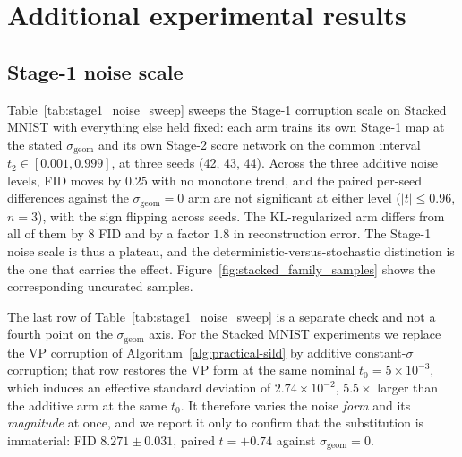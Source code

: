 
\section{Additional experimental results}
\label{app:extra-experiments}

\subsection{Stage-1 noise scale}
\label{app:stage1-noise}

Table~\ref{tab:stage1_noise_sweep} sweeps the Stage-1 corruption scale on
Stacked MNIST with everything else held fixed: each arm trains its own
Stage-1 map at the stated $\sigma_{\mathrm{geom}}$ and its own Stage-2 score
network on the common interval $t_2\in[0.001,0.999]$, at three seeds (42, 43,
44). Across the three additive noise levels, FID moves by $0.25$ with no
monotone trend, and the paired per-seed differences against the
$\sigma_{\mathrm{geom}}=0$ arm are not significant at either level
($\lvert t\rvert \le 0.96$, $n=3$), with the sign flipping across seeds. The
KL-regularized arm differs from all of them by $8$ FID and by a factor $1.8$
in reconstruction error. The Stage-1 noise scale is thus a plateau, and the
deterministic-versus-stochastic distinction is the one that carries the
effect. Figure~\ref{fig:stacked_family_samples} shows the corresponding
uncurated samples.

The last row of Table~\ref{tab:stage1_noise_sweep} is a separate check and
not a fourth point on the $\sigma_{\mathrm{geom}}$ axis. For the Stacked
MNIST experiments we replace the VP corruption of
Algorithm~\ref{alg:practical-sild} by additive constant-$\sigma$ corruption;
that row restores the VP form at the same nominal $t_0=5\!\times\!10^{-3}$,
which induces an effective standard deviation of $2.74\!\times\!10^{-2}$,
$5.5\times$ larger than the additive arm at the same $t_0$. It therefore
varies the noise \emph{form} and its \emph{magnitude} at once, and we report
it only to confirm that the substitution is immaterial: FID
$8.271 \pm 0.031$, paired $t=+0.74$ against $\sigma_{\mathrm{geom}}=0$.

